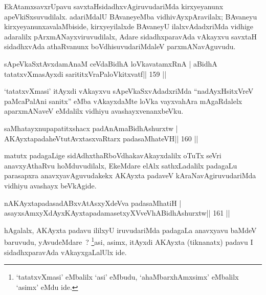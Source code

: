 \begin{artha}
EkAtamxsavxrUpavu savxtaHsidadhxvAgiruvudariMda kirxyeyanunx apeVkiSxsuvudilalx. adariMdalU BAvaneyeMba vidhivAyxpAravilalx; BAvaneyu kirxyeyanunx\break avalaMbiside, kirxyeyilalxde BAvaneyU ilalxvAdadxriMda vidhige adaralilx pArxmANayxviruvudilalx, Adare sidadhxparavAda vAkayxvu savxtaH sidadhxvAda athaRvanunx boVdhisuvudariMdaleV parxmANavAguvudu.
\end{artha}


\begin{shl}
sApeVkaSxtAvxdamAnaM ceVdaBidhA loVkavatamxRnA |
aBidhA tatatxvXmasAyxdi sarititxVraPaloVkitxvatf\hfill || 159 ||
\end{shl}

\begin{artha}
`tatatxvXmasi' itAyxdi vAkayxvu sApeVkaSxvAdadxriMda ``nadAyxHsitxVreV paMcaPalAni sanitx'' eMba vAkayxdaMte loVka vayxvahAra mAgaRdalelx aparxmANaveV eMdalilx vidhiyu avashayxvenanxbeVku.
\end{artha}

\begin{shl}
saMhatayxnupapatitxshacx padAnAmaBidhAshurxtw |
AKAyxtapadaheVtutAvxtasxvaRtarx padasaMhateVH\hfill || 160 ||
\end{shl}

\begin{artha}
matutx padagaLige sidAdhxthaRboVdhakavAkayxdalilx oTuTx seVri anavxyAthaRvu hoMduvudilalx, EkeMdare elAlx sathxLadalilx padagaLu parasapxra anavxyavAguvudakekx AKAyxta padaveV kAraNavAgiruvudariMda vidhiyu avashayx beVkAgide.
\end{artha}


\begin{shl}
nA\s\s KAyxtapadasadABxvAtAsxyXdeVva padasaMhatiH |
asayxsAmxyXdAyxKAyxtapadamasetxyXVveVhABidhAshurxtw\hfill || 161 ||
\end{shl}

\begin{artha}
hAgalalx, AKAyxta padavu ililxyU iruvudariMda padagaLa anavxyavu baMdeV baruvudu, yAvudeMdare~? \footnote{`tatatxvXmasi' eMbalilx `asi' eMbudu, `ahaMbarxhAmxsimx' eMbalilx `asimx' eMdu ide.}asi, asimx, itAyxdi AKAyxta (tiknanatx) padavu I sidadhxparavAda vAkayxgaLalUlx ide.
\end{artha}


